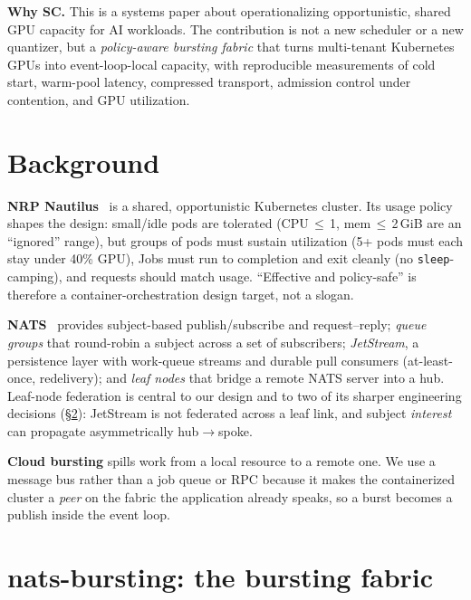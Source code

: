 \documentclass[conference]{IEEEtran}
\begin{document}
\textbf{Why SC.} This is a systems paper about operationalizing opportunistic, shared GPU capacity
for AI workloads. The contribution is not a new scheduler or a new quantizer, but a
\emph{policy-aware bursting fabric} that turns multi-tenant Kubernetes GPUs into
event-loop-local capacity, with reproducible measurements of cold start, warm-pool latency,
compressed transport, admission control under contention, and GPU utilization.

\section{Background}
\textbf{NRP Nautilus}~\cite{nautilus} is a shared, opportunistic Kubernetes cluster. Its usage
policy shapes the design: small/idle pods are tolerated (CPU\,$\le$\,1, mem\,$\le$\,2\,GiB are an
``ignored'' range), but groups of pods must sustain utilization (5+ pods must each stay under
40\% GPU), Jobs must run to completion and exit cleanly (no \texttt{sleep}-camping), and requests
should match usage. ``Effective and policy-safe'' is therefore a container-orchestration design
target, not a slogan.

\textbf{NATS}~\cite{nats} provides subject-based publish/subscribe and request--reply; \emph{queue
groups} that round-robin a subject across a set of subscribers; \emph{JetStream}, a persistence
layer with work-queue streams and durable pull consumers (at-least-once, redelivery); and
\emph{leaf nodes} that bridge a remote NATS server into a hub. Leaf-node federation is central to
our design and to two of its sharper engineering decisions (\S\ref{sec:bursting}): JetStream is
not federated across a leaf link, and subject \emph{interest} can propagate asymmetrically
hub$\to$spoke.

\textbf{Cloud bursting} spills work from a local resource to a remote one. We use a message bus
rather than a job queue or RPC because it makes the containerized cluster a \emph{peer} on the
fabric the application already speaks, so a burst becomes a publish inside the event loop.

\section{nats-bursting: the bursting fabric}\label{sec:bursting}
\end{document}
